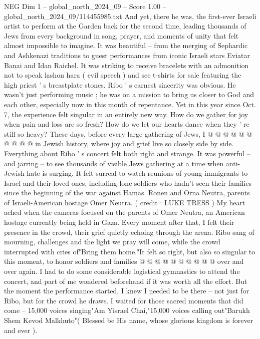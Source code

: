 \begin{textsample}{NEG Dim 1 – global\_north\_2024\_09 – Score 1.00 – global\_north\_2024\_09/114455985.txt}  \label{ex:f1_neg_028}
And yet, there he was, the first-ever Israeli artist to perform at the Garden back for the second time, leading thousands of Jews from every background in song, prayer, and moments of unity that felt almost impossible to imagine.
It was beautiful -- from the merging of Sephardic and Ashkenazi traditions to guest performances from iconic Israeli stars Eviatar Banai and Idan Raichel.
It was striking to receive bracelets with an admonition not to speak lashon hara ( evil speech ) and see t-shirts for sale featuring the high priest ' s breastplate stones.
Ribo ' s earnest sincerity was obvious.
He wasn't just performing music ; he was on a mission to bring us closer to God and each other, especially now in this month of repentance.
Yet in this year since Oct. 7, the experience felt singular in an entirely new way.
How do we gather for joy when pain and loss are so fresh?
How do we let our hearts dance when they ' re still so heavy?
These days, before every large gathering of Jews, I @ @ @ @ @ @ @ @ @ @ in Jewish history, where joy and grief live so closely side by side.
Everything about Ribo ' s concert felt both right and strange.
It was powerful -- and jarring -- to see thousands of visible Jews gathering at a time when anti-Jewish hate is surging.
It felt surreal to watch reunions of young immigrants to Israel and their loved ones, including lone soldiers who hadn't seen their families since the beginning of the war against Hamas.
Ronen and Orna Neutra, parents of Israeli-American hostage Omer Neutra. ( credit : LUKE TRESS ) My heart ached when the cameras focused on the parents of Omer Neutra, an American hostage currently being held in Gaza.
Every moment after that, I felt their presence in the crowd, their grief quietly echoing through the arena.
Ribo sang of mourning, challenges and the light we pray will come, while the crowd interrupted with cries of"Bring them home."It felt so right, but also so singular to this moment, to honor soldiers and families @ @ @ @ @ @ @ @ @ @ over and over again.
I had to do some considerable logistical gymnastics to attend the concert, and part of me wondered beforehand if it was worth all the effort.
But the moment the performance started, I knew I needed to be there -- not just for Ribo, but for the crowd he draws.
I waited for those sacred moments that did come -- 15,000 voices singing"Am Yisrael Chai,"15,000 voices calling out"Barukh Shem Kevod Malkhuto"( Blessed be His name, whose glorious kingdom is forever and ever ).

\end{textsample}
